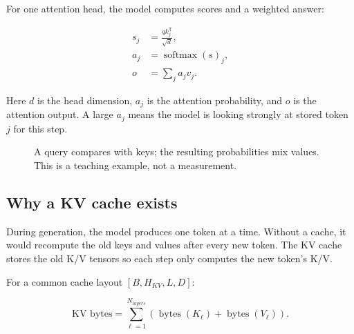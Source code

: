 \documentclass[11pt]{article}
\begin{document}
For one attention head, the model computes scores and a weighted answer:

\begin{align}
  s_j &= \frac{q k_j^{\mathsf T}}{\sqrt{d}}, \\
  a_j &= \operatorname{softmax}(s)_j, \\
  o &= \sum_j a_j v_j .
\end{align}

Here $d$ is the head dimension, $a_j$ is the attention probability, and $o$ is the attention
output. A large $a_j$ means the model is looking strongly at stored token $j$ for this step.

\begin{figure}[htbp]
\centering
{}
\caption{A query compares with keys; the resulting probabilities mix values. This is a teaching
example, not a measurement.}
\label{fig:attention}
\end{figure}

\subsection{Why a KV cache exists}

During generation, the model produces one token at a time. Without a cache, it would recompute the
old keys and values after every new token. The KV cache stores the old K/V tensors so each step
only computes the new token's K/V.

For a common cache layout $[B,H_{KV},L,D]$:

\begin{equation}
  \text{KV bytes} = \sum_{\ell=1}^{N_{layers}}
  \left(\operatorname{bytes}(K_\ell)+\operatorname{bytes}(V_\ell)\right).
\end{equation}
\end{document}
